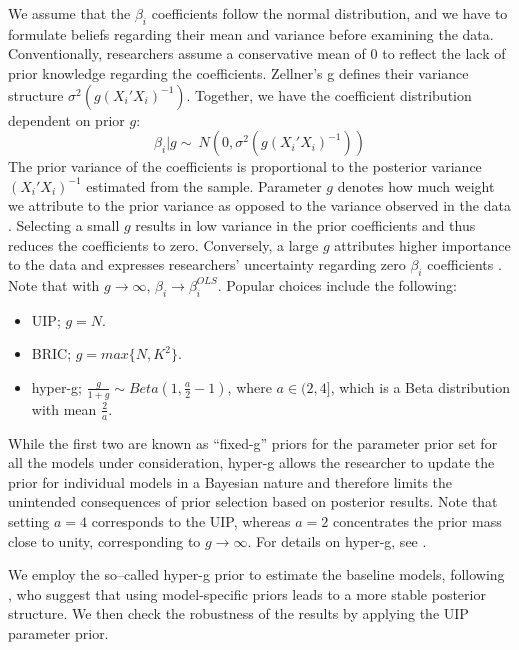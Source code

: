 \begin{refsection}
We assume that the $\beta_{i}$ coefficients follow the normal distribution, and we have to formulate beliefs regarding their mean and variance before examining the data. Conventionally, researchers assume a conservative mean of 0 to reflect the lack of prior knowledge regarding the coefficients. Zellner's g defines their variance structure $\sigma^{2}(g(X_{i}'X_{i})^{-1})$. Together, we have the coefficient distribution dependent on prior $g$:
%
\begin{equation}
	\beta_{i}\vert g \sim\ N(0, \sigma^{2}(g(X_{i}'X_{i})^{-1})) 
\end{equation}
The prior variance of the coefficients is proportional to the posterior variance $(X_{i}'X_{i})^{-1}$ estimated from the sample. Parameter $g$ denotes how much weight we attribute to the prior variance as opposed to the variance observed in the data \parencite{FeldkircherZeugner2009}. Selecting a small $g$ results in low variance in the prior coefficients and thus reduces the coefficients to zero. Conversely, a large $g$ attributes higher importance to the data and expresses researchers' uncertainty regarding zero $\beta_{i}$ coefficients \parencite{Zeugner2011}. Note that with $g \rightarrow \infty$, $\beta_{i} \rightarrow \beta^{OLS}_{i}$. Popular choices include the following:
\begin{itemize}
	\item \ac{UIP}; $g = N$.
	\item \ac{BRIC}; $g = max\{N, K^{2}\}$.
	\item hyper-g; $\frac{g}{1+g} \sim Beta (1, \frac{a}{2} - 1)$, where $a \in (2,4]$, which is a Beta distribution with mean $\frac{2}{a}$.
\end{itemize}
%
While the first two are known as ``fixed-g'' priors for the parameter prior set for all the models under consideration, hyper-g allows the researcher to update the prior for individual models in a Bayesian nature and therefore limits the unintended consequences of prior selection based on posterior results. Note that setting $a=4$ corresponds to the \ac{UIP}, whereas $a=2$ concentrates the prior mass close to unity, corresponding to $g \rightarrow \infty$. For details on hyper-g, see \textcite{Liangetal2008}.

We employ the so--called hyper-g prior to estimate the baseline models, following \textcite{FeldkircherZeugner2009}, who suggest that using model-specific priors leads to a more stable posterior structure. We then check the robustness  of the results by applying the \ac{UIP} parameter prior.


\end{refsection}
